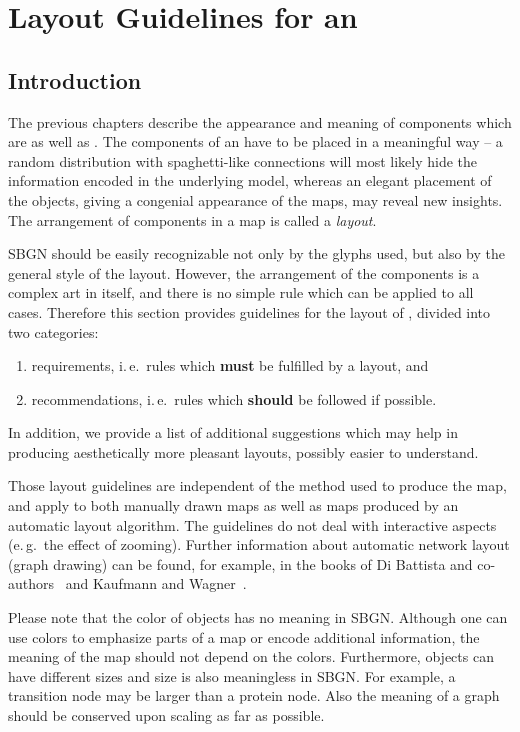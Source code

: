 \chapter{Layout Guidelines for an \ERm}
\label{chp:layout}

\section{Introduction}

The previous chapters describe the appearance and meaning of \SBGNERLone components which are  as well as . The components of an \ERm have to be placed in a meaningful way -- a random distribution with spaghetti-like connections will most likely hide the information encoded in the underlying model, whereas an elegant placement of the objects, giving a congenial appearance of the maps, may reveal new insights. The arrangement of components in a map is called a \emph{layout}.

SBGN \ERms should be easily recognizable not only by the glyphs used, but also by the general style of the layout. However, the arrangement of the components is a complex art in itself, and there is no simple rule which can be applied to all cases. Therefore this section provides guidelines for the layout of \ERs, divided into two categories:
\begin{enumerate}
  \item requirements, i.\,e.~rules which \textbf{must} be fulfilled by a layout, and
  \item recommendations, i.\,e.~rules which \textbf{should} be followed if possible.
\end{enumerate}
In addition, we provide a list of additional suggestions which may help in producing aesthetically more pleasant layouts, possibly easier to understand.

Those layout guidelines are independent of the method used to produce the map, and apply to both manually drawn maps as well as maps produced by an automatic layout algorithm. The guidelines do not deal with interactive aspects (e.\,g.~the effect of zooming). Further information about automatic network layout (graph drawing) can be found, for example, in the books of Di Battista and co-authors~\cite{DiBattista:1998} and Kaufmann and Wagner~\cite{Kaufmann:2001}.

Please note that the color of objects has no meaning in SBGN. Although one can use colors to emphasize parts of a map or encode additional information, the meaning of the map should not depend on the colors. Furthermore, objects can have different sizes and size is also meaningless in SBGN. For example, a transition node may be larger than a protein node. Also the meaning of a graph should be conserved upon scaling as far as possible.

